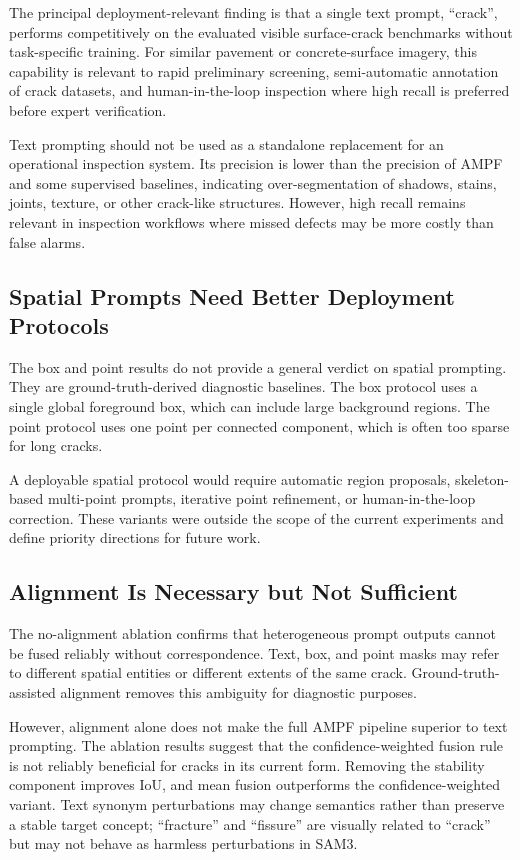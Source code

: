 \documentclass[applsci,article,submit,pdftex,moreauthors]{Definitions/mdpi}
\begin{document}
The principal deployment-relevant finding is that a single text prompt,
``crack'', performs competitively on the evaluated visible surface-crack
benchmarks without task-specific training. For similar pavement or
concrete-surface imagery, this capability is relevant to rapid
preliminary screening, semi-automatic annotation of crack datasets, and
human-in-the-loop inspection where high recall is preferred before
expert verification.

Text prompting should not be used as a standalone replacement for an
operational inspection system. Its precision is lower than the precision
of AMPF and some supervised baselines, indicating over-segmentation of
shadows, stains, joints, texture, or other crack-like structures.
However, high recall remains relevant in inspection workflows where
missed defects may be more costly than false alarms.

\subsection{Spatial Prompts Need Better Deployment Protocols}

The box and point results do not provide a general verdict on spatial
prompting. They are ground-truth-derived diagnostic baselines. The box
protocol uses a single global foreground box, which can include large
background regions. The point protocol uses one point per connected
component, which is often too sparse for long cracks.

A deployable spatial protocol would require automatic region proposals,
skeleton-based multi-point prompts, iterative point refinement, or
human-in-the-loop correction. These variants were outside the scope of
the current experiments and define priority directions for future work.

\subsection{Alignment Is Necessary but Not Sufficient}

The no-alignment ablation confirms that heterogeneous prompt outputs
cannot be fused reliably without correspondence. Text, box, and point
masks may refer to different spatial entities or different extents of
the same crack. Ground-truth-assisted alignment removes this ambiguity
for diagnostic purposes.

However, alignment alone does not make the full AMPF pipeline superior
to text prompting. The ablation results suggest that the
confidence-weighted fusion rule is not reliably beneficial for cracks in
its current form. Removing the stability component improves IoU, and
mean fusion outperforms the confidence-weighted variant. Text synonym
perturbations may change semantics rather than preserve a stable target
concept; ``fracture'' and ``fissure'' are visually related to ``crack''
but may not behave as harmless perturbations in SAM3.
\end{document}
